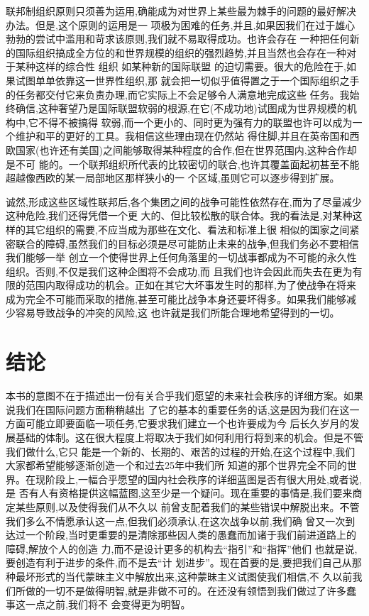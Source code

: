 ﻿\documentclass[12pt]{article}
\begin{document}
联邦制组织原则只须善为运用,确能成为对世界上某些最为棘手的问题的最好解决办法。但是,这个原则的运用是一
项极为困难的任务,并且,如果因我们在过于雄心勃勃的尝试中滥用和苛求该原则,我们就不易取得成功。也许会存在
一种把任何新的国际组织搞成全方位的和世界规模的组织的强烈趋势,并且当然也会存在一种对于某种这样的综合性
组织 \myrule 如某种新的国际联盟 \myrule 的迫切需要。很大的危险在于,如果试图单单依靠这一世界性组织,那
就会把一切似乎值得置之于一个国际组织之手的任务都交付它来负责办理,而它实际上不会足够令人满意地完成这些
任务。我始终确信,这种奢望乃是国际联盟软弱的根源,在它(不成功地)试图成为世界规模的机构中,它不得不被搞得
软弱,而一个更小的、同时更为强有力的联盟也许可以成为一个维护和平的更好的工具。我相信这些理由现在仍然站
得住脚,并且在英帝国和西欧国家(也许还有美国)之间能够取得某种程度的合作,但在世界范围内,这种合作却是不可
能的。一个联邦组织所代表的比较密切的联合,也许其覆盖面起初甚至不能超越像西欧的某一局部地区那样狭小的一
个区域,虽则它可以逐步得到扩展。

诚然,形成这些区域性联邦后,各个集团之间的战争可能性依然存在,而为了尽量减少这种危险,我们还得凭借一个更
大的、但比较松散的联合体。我的看法是,对某种这样的其它组织的需要,不应当成为那些在文化、看法和标准上很
相似的国家之间紧密联合的障碍,虽然我们的目标必须是尽可能防止未来的战争,但我们务必不要相信我们能够一举
创立一个使得世界上任何角落里的一切战事都成为不可能的永久性组织。否则,不仅是我们这种企图将不会成功,而
且我们也许会因此而失去在更为有限的范围内取得成功的机会。正如在其它大坏事发生时的那样,为了使战争在将来
成为完全不可能而采取的措施,甚至可能比战争本身还要坏得多。如果我们能够减少容易导致战争的冲突的风险,这
也许就是我们所能合理地希望得到的一切。


\section{结论}

本书的意图不在于描述出一份有关合乎我们愿望的未来社会秩序的详细方案。如果说我们在国际问题方面稍稍越出
了它的基本的重要任务的话,这是因为我们在这一方面可能立即要面临一项任务,它要求我们建立一个也许要成为今
后长久岁月的发展基础的体制。这在很大程度上将取决于我们如何利用行将到来的机会。但是不管我们做什么,它只
能是一个新的、长期的、艰苦的过程的开始,在这个过程中,我们大家都希望能够逐渐创造一个和过去25年中我们所
知道的那个世界完全不同的世界。在现阶段上,一幅合乎愿望的国内社会秩序的详细蓝图是否有很大用处,或者说,是
否有人有资格提供这幅蓝图,这至少是一个疑问。现在重要的事情是,我们要来商定某些原则,以及使得我们从不久以
前曾支配着我们的某些错误中解脱出来。不管我们多么不情愿承认这一点,但我们必须承认,在这次战争以前,我们确
曾又一次到达过一个阶段,当时更重要的是清除那些因人类的愚蠢而加诸于我们前进道路上的障碍,解放个人的创造
力,而不是设计更多的机构去``指引''和``指挥''他们 \myrule 也就是说,要创造有利于进步的条件,而不是去``计
划进步''。现在首要的是,要把我们自己从那种最坏形式的当代蒙昧主义中解放出来,这种蒙昧主义试图使我们相信,不
久以前我们所做的一切不是做得明智,就是非做不可的。在还没有领悟到我们做过了许多蠢事这一点之前,我们将不
会变得更为明智。
\end{document}
